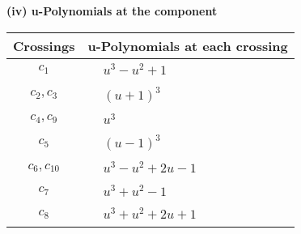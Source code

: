 \documentclass[1p]{elsarticle_modified}
\theoremstyle{definition}
\begin{document}
\newpage\renewcommand{\arraystretch}{1}
\flushleft \textbf{(iv) u-Polynomials at the component}\newline \\
\begin{tabular}{m{50pt}|m{274pt}}
Crossings & \hspace{64pt}u-Polynomials at each crossing \\
\hline $$\begin{aligned}c_{1}\end{aligned}$$&$\begin{aligned}
&u^3- u^2+1
\end{aligned}$\\
\hline $$\begin{aligned}c_{2},c_{3}\end{aligned}$$&$\begin{aligned}
&(u+1)^3
\end{aligned}$\\
\hline $$\begin{aligned}c_{4},c_{9}\end{aligned}$$&$\begin{aligned}
&u^3
\end{aligned}$\\
\hline $$\begin{aligned}c_{5}\end{aligned}$$&$\begin{aligned}
&(u-1)^3
\end{aligned}$\\
\hline $$\begin{aligned}c_{6},c_{10}\end{aligned}$$&$\begin{aligned}
&u^3- u^2+2 u-1
\end{aligned}$\\
\hline $$\begin{aligned}c_{7}\end{aligned}$$&$\begin{aligned}
&u^3+u^2-1
\end{aligned}$\\
\hline $$\begin{aligned}c_{8}\end{aligned}$$&$\begin{aligned}
&u^3+u^2+2 u+1
\end{aligned}$\\
\hline
\end{tabular}\\~\\
\newpage\renewcommand{\arraystretch}{1}
\end{document}
